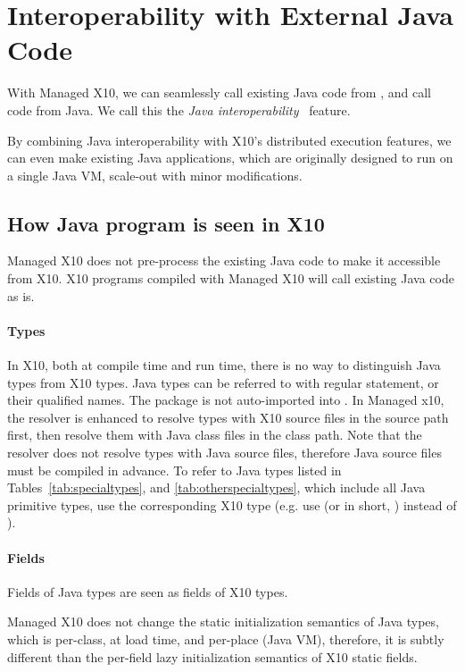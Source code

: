\section{Interoperability with External Java Code}

With Managed X10, we can seamlessly call existing Java code from \Xten{},
and call \Xten{} code from Java.  We call this the 
\emph{Java interoperability}~\cite{TakeuchiX1013} feature.

By combining Java interoperability with X10's distributed
execution features, we can even make existing Java applications, which
are originally designed to run on a single Java VM, scale-out with
minor modifications.

\subsection{How Java program is seen in X10}

Managed X10 does not pre-process the existing Java code to make it
accessible from X10.  X10 programs compiled with Managed X10 will call
existing Java code as is.

\paragraph{Types}

In X10, both at compile time and run time, there is no way to
distinguish Java types from X10 types.  Java types can be referred to
with regular  statement, or their qualified names.  The
package  is not auto-imported into \Xten.  In Managed
x10, the resolver is enhanced to resolve types with X10 source files
in the source path first, then resolve them with Java class files in
the class path. Note that the resolver does not resolve types with
Java source files, therefore Java source files must be compiled in
advance.  To refer to Java types listed in
Tables~\ref{tab:specialtypes}, and \ref{tab:otherspecialtypes}, which
include all Java primitive types, use the corresponding X10 type
(e.g. use  (or in short, ) instead of
).

\paragraph{Fields}

Fields of Java types are seen as fields of X10 types.

Managed X10 does not change the static initialization semantics of
Java types, which is per-class, at load time, and per-place (Java VM),
therefore, it is subtly different than the per-field lazy
initialization semantics of X10 static fields.

